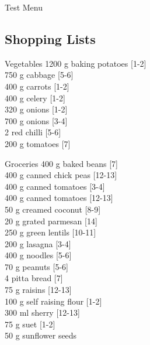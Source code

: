 \begin{menu}{Test Menu}
    \subsection*{Shopping Lists}
      \begin{shoppinglist}{Vegetables}
      1200 g baking potatoes 
        {\scriptsize[1-2]}\\
      750 g cabbage 
        {\scriptsize[5-6]}\\
      400 g carrots 
        {\scriptsize[1-2]}\\
      400 g celery 
        {\scriptsize[1-2]}\\
      320 g onions 
        {\scriptsize[1-2]}\\
      700 g onions 
        {\scriptsize[3-4]}\\
      2  red chilli 
        {\scriptsize[5-6]}\\
      200 g tomatoes 
        {\scriptsize[7]}\\
      \end{shoppinglist}%
      \begin{shoppinglist}{Groceries}
      400 g baked beans 
        {\scriptsize[7]}\\
      400 g canned chick peas 
        {\scriptsize[12-13]}\\
      400 g canned tomatoes 
        {\scriptsize[3-4]}\\
      400 g canned tomatoes 
        {\scriptsize[12-13]}\\
      50 g creamed coconut 
        {\scriptsize[8-9]}\\
      20 g grated parmesan 
        {\scriptsize[14]}\\
      250 g green lentils 
        {\scriptsize[10-11]}\\
      200 g lasagna 
        {\scriptsize[3-4]}\\
      400 g noodles 
        {\scriptsize[5-6]}\\
      70 g peanuts 
        {\scriptsize[5-6]}\\
      4  pitta bread 
        {\scriptsize[7]}\\
      75 g raisins 
        {\scriptsize[12-13]}\\
      100 g self raising flour 
        {\scriptsize[1-2]}\\
      300 ml sherry 
        {\scriptsize[12-13]}\\
      75 g suet 
        {\scriptsize[1-2]}\\
      50 g sunflower seeds 

\end{shoppinglist}
\end{menu}
